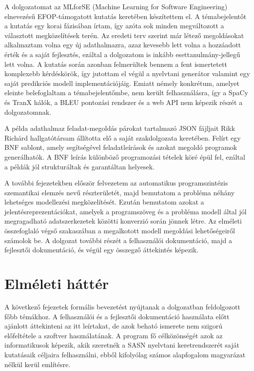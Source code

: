\documentclass[twoside, 12pt]{report}
\begin{document}
A dolgozatomat az MLforSE (Machine Learning for Software Engineering) elnevezésű EFOP-támogatott kutatás keretében készítettem el. A témabejelentőt a kutatás egy korai fázisában írtam, így azóta sok minden megváltozott a választott megközelítések terén. Az eredeti terv szerint már létező megoldásokat alkalmaztam volna egy új adathalmazra, azaz kevesebb lett volna a hozzáadott érték és a saját fejlesztés, ezáltal a dolgozatom is inkább esettanulmány-jellegű lett volna. A kutatás során azonban felmerültek bennem a fent ismertetett komplexebb kérdéskörök, így jutottam el végül a nyelvtani generátor valamint egy saját predikciós modell implementációjáig. Emiatt némely konkrétum, amelyet eleinte belefoglaltam a témabejelentőmbe, nem került felhasználásra, így a SpaCy\footnotemark{} és TranX hálók, a BLEU pontozási rendszer \parencite{Pap+02a} és a web API nem képezik részét a dolgozatomnak.


A példa adathalmaz feladat-megoldás párokat tartalmazó JSON fájljait Rikk Richárd hallgatótársam állította elő a saját szakdolgozata keretében. Felírt egy BNF \parencite{Bac59a} sablont, amely segítségével feladatleírások és azokat megoldó programok generálhatók. A BNF leírás különböző programozási tételek \parencite{Gre10a} köré épül fel, ezáltal a példák jól strukturáltak és garantáltan helyesek.

A további fejezetekben először felvezetem az automatikus programszintézis szemantikai elemzés nevű részterületét, majd bemutatom a probléma néhány lehetséges modellezési megközelítését. Ezután bemutatom azokat a jelentésreprezentációkat, amelyek a programszöveg és a probléma modell által jól megragadható adatszerkezetek közötti konverzió során jönnek létre. Az elméleti összefoglaló végső szakaszában a megalkotott modell megoldási lehetőségeiről számolok be. A dolgozat további részét a felhasználói dokumentáció, majd a fejlesztői dokumentáció, és végül egy összegző áttekintés képezik.

\chapter{Elméleti háttér}

A következő fejezetek formális bevezetést nyújtanak a dolgozatban feldolgozott főbb témákhoz. A felhasználói és a fejlesztői dokumentáció használata előtt ajánlott áttekinteni az itt leírtakat, de azok beható ismerete nem szigorú előfeltétele a szoftver használatának. A program fő célközönségét azok az informatikusok képezik, akik szeretnék a SASN nyelvtani keretrendszerét saját kutatásaik céljaira felhasználni, ebből kifolyólag számos alapfogalom magyarázat nélkül kerül említésre.
\end{document}
